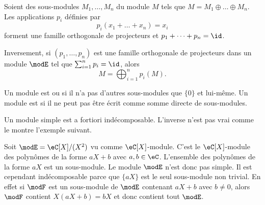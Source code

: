 \begin{theorem}     \label{ThoProjModpAlsUR}
    Soient des sous-modules \( M_1,\ldots,M_n\) du module \( M \) tels que \( M=M_1\oplus\ldots\oplus M_n\). Les applications \( p_i\) définies par
    \begin{equation}
        p_i(x_1+\ldots+x_n)=x_i
    \end{equation}
    forment une famille orthogonale de projecteurs et \( p_1+\cdots +p_n=\id\).

    Inversement, si \( (p_1,\ldots, p_n)\) est une famille orthogonale de projecteurs dans un module \( \modE\) tel que \( \sum_{i=1}^np_i=\id\), alors
    \begin{equation}
        M=\bigoplus_{i=1}^np_i(M).
    \end{equation}
\end{theorem}

\begin{definition}
    Un module est  ou  si il n'a pas d'autres sous-modules que \( \{ 0 \}\) et lui-même. Un module est  si il ne peut pas être écrit comme somme directe de sous-modules.
\end{definition}

Un module simple est a fortiori indécomposable. L'inverse n'est pas vrai comme le montre l'exemple suivant.

\begin{example}
    Soit \( \modE=\eC[X]/(X^2)\) vu comme \( \eC[X]\)-module. C'est le \( \eC[X]\)-module des polynômes de la forme \( aX+b\) avec \( a,b\in \eC\). L'ensemble des polynômes de la forme \( aX\) est un sous-module. Le module \( \modE\) n'est donc pas simple. Il est cependant indécomposable parce que \( \{ aX \}\) est le seul sous-module non trivial. En effet si \( \modF\) est un sous-module de \( \modE\) contenant \( aX+b\) avec \( b\neq 0\), alors \( \modF\) contient \( X(aX+b)=bX\) et donc contient tout \( \modE\).
\end{example}

